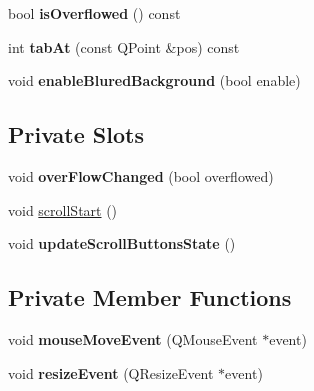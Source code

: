 \begin{DoxyCompactItemize}
\item 
\hypertarget{class_tab_bar_scroll_widget_acefc10337736ee7b075e27ad53dd2441}{
bool {\bfseries isOverflowed} () const }
\label{class_tab_bar_scroll_widget_acefc10337736ee7b075e27ad53dd2441}

\item 
\hypertarget{class_tab_bar_scroll_widget_a6ea868a68da8ecf19a970c3a8e8bf8cc}{
int {\bfseries tabAt} (const QPoint \&pos) const }
\label{class_tab_bar_scroll_widget_a6ea868a68da8ecf19a970c3a8e8bf8cc}

\item 
\hypertarget{class_tab_bar_scroll_widget_ae850dc2df1840e30e2bf3220a473419c}{
void {\bfseries enableBluredBackground} (bool enable)}
\label{class_tab_bar_scroll_widget_ae850dc2df1840e30e2bf3220a473419c}

\end{DoxyCompactItemize}
\subsection*{Private Slots}
\begin{DoxyCompactItemize}
\item 
\hypertarget{class_tab_bar_scroll_widget_aa2df438b67f0f1ab1b5720b2fa8e2dc0}{
void {\bfseries overFlowChanged} (bool overflowed)}
\label{class_tab_bar_scroll_widget_aa2df438b67f0f1ab1b5720b2fa8e2dc0}

\item 
void \hyperlink{class_tab_bar_scroll_widget_a05a239bfcf3fe7853b75dd8366132406}{scrollStart} ()
\item 
\hypertarget{class_tab_bar_scroll_widget_a1ad0599b9615485b62f4630c01379ba5}{
void {\bfseries updateScrollButtonsState} ()}
\label{class_tab_bar_scroll_widget_a1ad0599b9615485b62f4630c01379ba5}

\end{DoxyCompactItemize}
\subsection*{Private Member Functions}
\begin{DoxyCompactItemize}
\item 
\hypertarget{class_tab_bar_scroll_widget_a31dce9b238060a7c0355d7d14100cb24}{
void {\bfseries mouseMoveEvent} (QMouseEvent $\ast$event)}
\label{class_tab_bar_scroll_widget_a31dce9b238060a7c0355d7d14100cb24}

\item 
\hypertarget{class_tab_bar_scroll_widget_a02deb9f280753efe681a14d047da4f63}{
void {\bfseries resizeEvent} (QResizeEvent $\ast$event)}
\label{class_tab_bar_scroll_widget_a02deb9f280753efe681a14d047da4f63}

\end{DoxyCompactItemize}
